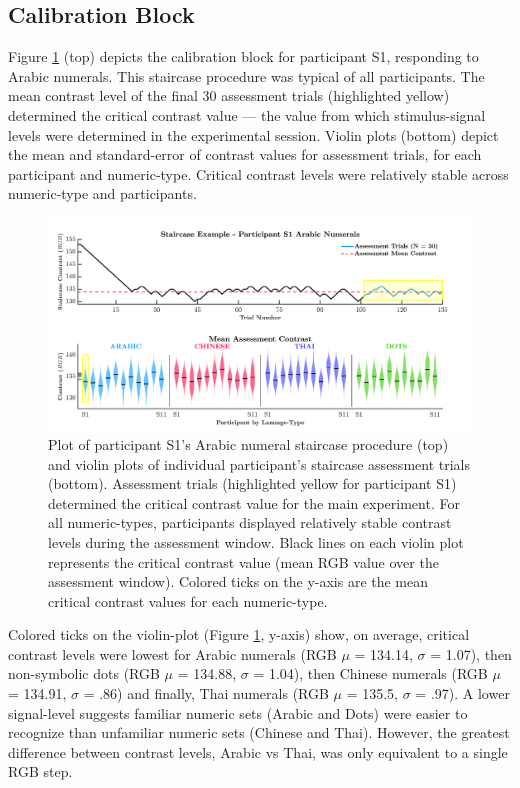 \subsection{Calibration Block}
Figure \ref{fig:Staircase} (top) depicts the calibration block for participant S1, responding to Arabic numerals. This staircase procedure was typical of all participants. The mean contrast level of the final 30 assessment trials (highlighted yellow) determined the critical contrast value --- the value from which stimulus-signal levels were determined in the experimental session. Violin plots (bottom) depict the mean and standard-error of contrast values for assessment trials, for each participant and numeric-type. Critical contrast levels were relatively stable across numeric-type and participants. 

\begin{figure}[tbh]
\centering \includegraphics[width=\linewidth]{Figures/Wheel/Staircase.pdf}
\caption{Plot of participant S1's Arabic numeral staircase procedure (top) and violin plots of individual participant's staircase assessment trials (bottom). Assessment trials (highlighted yellow for participant S1) determined the critical contrast value for the main experiment. For all numeric-types, participants displayed relatively stable contrast levels during the assessment window. Black lines on each violin plot represents the critical contrast value (mean RGB value over the assessment window). Colored ticks on the y-axis are the mean critical contrast values for each numeric-type.}
\label{fig:Staircase}
\end{figure}

Colored ticks on the violin-plot (Figure \ref{fig:Staircase}, y-axis) show, on average, critical contrast levels were lowest for Arabic numerals (RGB $\mu$ = 134.14, $\sigma$ = 1.07), then non-symbolic dots (RGB $\mu$ = 134.88, $\sigma$ = 1.04), then Chinese numerals (RGB $\mu$ = 134.91, $\sigma$ = .86) and finally, Thai numerals (RGB $\mu$ = 135.5, $\sigma$ = .97). A lower signal-level suggests familiar numeric sets (Arabic and Dots) were easier to recognize than unfamiliar numeric sets (Chinese and Thai). However, the greatest difference between contrast levels, Arabic vs Thai, was only equivalent to a single RGB step.

